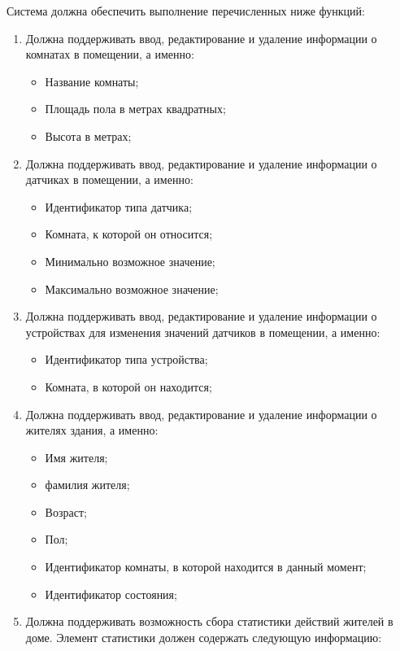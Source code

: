       Система должна обеспечить выполнение перечисленных ниже функций:
      \begin{enumerate}
        \item Должна поддерживать ввод, редактирование и удаление информации о комнатах в помещении, а именно:
          \begin{itemize}
            \item Название комнаты;
            \item Площадь пола в метрах квадратных;
            \item Высота в метрах;
          \end{itemize}
        \item Должна поддерживать ввод, редактирование и удаление информации о датчиках в помещении, а именно:
          \begin{itemize}
            \item Идентификатор типа датчика;
            \item Комната, к которой он относится;
            \item Минимально возможное значение;
            \item Максимально возможное значение;
          \end{itemize}
        \item Должна поддерживать ввод, редактирование и удаление информации о устройствах для изменения значений датчиков в помещении, а именно:
          \begin{itemize}
            \item Идентификатор типа устройства;
            \item Комната, в которой он находится;
          \end{itemize}
        \item Должна поддерживать ввод, редактирование и удаление информации о жителях здания, а именно:
          \begin{itemize}
            \item Имя жителя; 
            \item фамилия жителя;
            \item Возраст;
            \item Пол;
            \item Идентификатор комнаты, в которой находится в данный момент;
            \item Идентификатор состояния;
          \end{itemize}
        \item Должна поддерживать возможность сбора статистики действий жителей в доме. Элемент статистики должен содержать следующую информацию: 

\end{enumerate}
